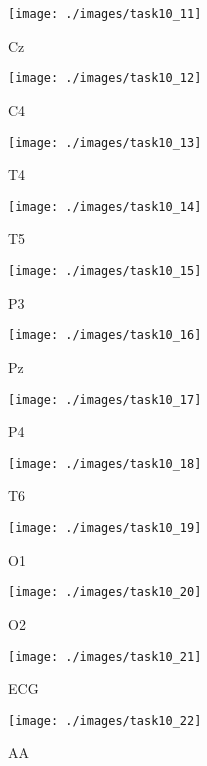 \begin{figure}[!ht]
    \centering
    \texttt{[image: ./images/task10\_11]}
    \caption{Cz}
    \label{fig:task10_cz}
\end{figure}

\begin{figure}[!ht]
    \centering
    \texttt{[image: ./images/task10\_12]}
    \caption{C4}
    \label{fig:task10_c4}
\end{figure}

\begin{figure}[!ht]
    \centering
    \texttt{[image: ./images/task10\_13]}
    \caption{T4}
    \label{fig:task10_t4}
\end{figure}

\begin{figure}[!ht]
    \centering
    \texttt{[image: ./images/task10\_14]}
    \caption{T5}
    \label{fig:task10_t5}
\end{figure}

\begin{figure}[!ht]
    \centering
    \texttt{[image: ./images/task10\_15]}
    \caption{P3}
    \label{fig:task10_p3}
\end{figure}

\begin{figure}[!ht]
    \centering
    \texttt{[image: ./images/task10\_16]}
    \caption{Pz}
    \label{fig:task10_pz}
\end{figure}

\begin{figure}[!ht]
    \centering
    \texttt{[image: ./images/task10\_17]}
    \caption{P4}
    \label{fig:task10_p4}
\end{figure}

\begin{figure}[!ht]
    \centering
    \texttt{[image: ./images/task10\_18]}
    \caption{T6}
    \label{fig:task10_t6}
\end{figure}

\begin{figure}[!ht]
    \centering
    \texttt{[image: ./images/task10\_19]}
    \caption{O1}
    \label{fig:task10_o1}
\end{figure}

\begin{figure}[!ht]
    \centering
    \texttt{[image: ./images/task10\_20]}
    \caption{O2}
    \label{fig:task10_o2}
\end{figure}

\begin{figure}[!ht]
    \centering
    \texttt{[image: ./images/task10\_21]}
    \caption{ECG}
    \label{fig:task10_ecg}
\end{figure}

\begin{figure}[!ht]
    \centering
    \texttt{[image: ./images/task10\_22]}
    \caption{AA}
    \label{fig:task10_aa}
\end{figure}
